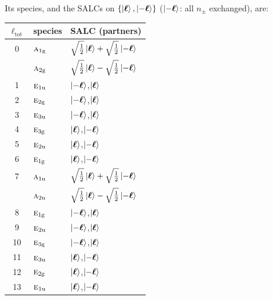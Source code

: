 \documentclass[11pt]{article}
\newcommand{\irr}[1]{\text{\normalfont\scshape #1}}
\newcommand{\ptag}[1]{\mathrm{#1}}
\begin{document}
Its species, and the SALCs on $\{\ket{\boldsymbol\ell},\ket{-\boldsymbol\ell}\}$ ($\ket{-\boldsymbol\ell}$: all $n_\pm$ exchanged), are:

\begin{longtable}{c l l}\hline $\ell_{\mathrm{tot}}$ & species & SALC (partners)\\ \hline\endhead

0 & $\irr{a}_{1\ptag{g}}$ & $\sqrt{\tfrac{1}{2}}\ket{\boldsymbol\ell}+\sqrt{\tfrac{1}{2}}\ket{-\boldsymbol\ell}$\\

 & $\irr{a}_{2\ptag{g}}$ & $\sqrt{\tfrac{1}{2}}\ket{\boldsymbol\ell}-\sqrt{\tfrac{1}{2}}\ket{-\boldsymbol\ell}$\\

1 & $\irr{e}_{1\ptag{u}}$ & $\ket{-\boldsymbol\ell}$,\quad $\ket{\boldsymbol\ell}$\\

2 & $\irr{e}_{2\ptag{g}}$ & $\ket{-\boldsymbol\ell}$,\quad $\ket{\boldsymbol\ell}$\\

3 & $\irr{e}_{3\ptag{u}}$ & $\ket{-\boldsymbol\ell}$,\quad $\ket{\boldsymbol\ell}$\\

4 & $\irr{e}_{3\ptag{g}}$ & $\ket{\boldsymbol\ell}$,\quad $\ket{-\boldsymbol\ell}$\\

5 & $\irr{e}_{2\ptag{u}}$ & $\ket{\boldsymbol\ell}$,\quad $\ket{-\boldsymbol\ell}$\\

6 & $\irr{e}_{1\ptag{g}}$ & $\ket{\boldsymbol\ell}$,\quad $\ket{-\boldsymbol\ell}$\\

7 & $\irr{a}_{1\ptag{u}}$ & $\sqrt{\tfrac{1}{2}}\ket{\boldsymbol\ell}+\sqrt{\tfrac{1}{2}}\ket{-\boldsymbol\ell}$\\

 & $\irr{a}_{2\ptag{u}}$ & $\sqrt{\tfrac{1}{2}}\ket{\boldsymbol\ell}-\sqrt{\tfrac{1}{2}}\ket{-\boldsymbol\ell}$\\

8 & $\irr{e}_{1\ptag{g}}$ & $\ket{-\boldsymbol\ell}$,\quad $\ket{\boldsymbol\ell}$\\

9 & $\irr{e}_{2\ptag{u}}$ & $\ket{-\boldsymbol\ell}$,\quad $\ket{\boldsymbol\ell}$\\

10 & $\irr{e}_{3\ptag{g}}$ & $\ket{-\boldsymbol\ell}$,\quad $\ket{\boldsymbol\ell}$\\

11 & $\irr{e}_{3\ptag{u}}$ & $\ket{\boldsymbol\ell}$,\quad $\ket{-\boldsymbol\ell}$\\

12 & $\irr{e}_{2\ptag{g}}$ & $\ket{\boldsymbol\ell}$,\quad $\ket{-\boldsymbol\ell}$\\

13 & $\irr{e}_{1\ptag{u}}$ & $\ket{\boldsymbol\ell}$,\quad $\ket{-\boldsymbol\ell}$\\

\hline\end{longtable}
\end{document}
